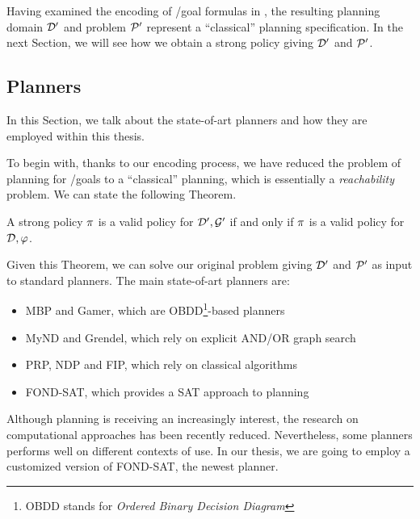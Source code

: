 Having examined the encoding of \LTLf/\PLTL goal formulas in \PDDL, the resulting planning domain $\D'$ and problem $\P'$ represent a ``classical'' planning specification. In the next Section, we will see how we obtain a strong policy giving $\D'$ and $\P'$.

\subsection{\FOND Planners}
In this Section, we talk about the state-of-art \FOND planners and how they are employed within this thesis.

To begin with, thanks to our encoding process, we have reduced the problem of \FOND planning for \LTLf/\PLTL goals to a ``classical'' \FOND planning, which is essentially a \textit{reachability} problem. We can state the following Theorem.

\begin{theorem}
A strong policy $\trace$ is a valid policy for $\D', \G'$ if and only if $\trace$ is a valid policy for $\D,\varphi$.
\end{theorem}

Given this Theorem, we can solve our original problem giving $\D'$ and $\P'$ as input to standard \FOND planners. The main state-of-art \FOND planners are:
\begin{itemize}
\item MBP and Gamer, which are OBDD\footnote{OBDD stands for \textit{Ordered Binary Decision Diagram}}-based planners \citep{cimatti2003weak, kissmann2009solving}
\item MyND and Grendel, which rely on explicit AND/OR graph search \citep{bercher2010pattern, ramirez2014directed}
\item PRP, NDP and FIP, which rely on classical algorithms \citep{kuter2008using, fu2011simple, muise2012improved}
\item FOND-SAT, which provides a SAT approach to \FOND planning \citep{geffner2018compact}
\end{itemize}
Although \FOND planning is receiving an increasingly interest, the research on computational approaches has been recently reduced. Nevertheless, some planners performs well on different contexts of use. In our thesis, we are going to employ a customized version of FOND-SAT, the newest planner.


